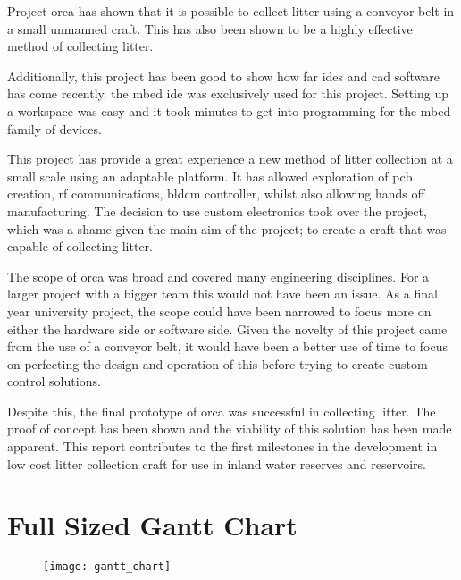 \documentclass [11pt]{article}
\begin{document}
Project \gls{orca} has shown that it is possible to collect litter using a conveyor belt in a small unmanned craft. This has also been shown to be a highly effective method of collecting litter. 

Additionally, this project has been good to show how far \gls{ide}s and \gls{cad} software has come recently. the \gls{mbed} \gls{ide} was exclusively used for this project. Setting up a workspace was easy and it took minutes to get into programming for the \gls{mbed} family of devices. 

This project has provide a great experience a new method of litter collection at a small scale using an adaptable platform. It has allowed exploration of \gls{pcb} creation, \gls{rf} communications, \gls{bldcm} controller, whilst also allowing hands off manufacturing. The decision to use custom electronics took over the project, which was a shame given the main aim of the project; to create a craft that was capable of collecting litter. 

The scope of \gls{orca} was broad and covered many engineering disciplines. For a larger project with a bigger team this would not have been an issue. As a final year university project, the scope could have been narrowed to focus more on either the hardware side or software side. Given the novelty of this project came from the use of a conveyor belt, it would have been a better use of time to focus on perfecting the design and operation of this before trying to create custom control solutions. 

Despite this, the final prototype of \gls{orca} was successful in collecting litter. The proof of concept has been shown and the viability of this solution has been made apparent. This report contributes to the first milestones in the development in low cost litter collection craft for use in inland water reserves and reservoirs. 

\newpage




\newpage
\appendix

\section{Full Sized Gantt Chart}\label{app:gantt_chart}
\begin{figure}[H]
\centerline{\texttt{[image: gantt\_chart]}}
\end{figure}
\end{document}
